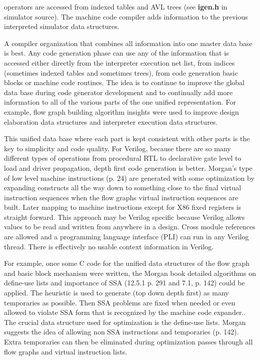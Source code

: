 \documentclass[preprint, authoryear]{sigplanconf}
\begin{document}
operators are accessed from indexed tables and AVL trees (see \textbf{igen.h}
in simulator source).  The machine code compiler adds information to the
previous interpreted simulator data structures.
\par
A compiler organization that combines all information into one
master data base is best.  Any code generation phase can use any
of the information that is accessed either directly from the interpreter
execution net list, from indices (sometimes indexed tables and sometimes
trees), from code generation basic blocks or machine code routines.
The idea is to continue to improve the global data base during code generator
development and to continually add more information to all of the various
parts of the one unified representation.  For example, flow graph
building algorithm insights were used to improve design elaboration
data structures and interpreter execution data structures.
\par
This unified data base where each part is kept consistent with other
parts is the key to simplicity and code quality.  For Verilog,
because there are so many different types of operations from
procedural RTL to declarative gate level to load and driver propagation,
depth first code generation is better.  Morgan's type of low level
machine instructions (p. 24) are generated with some optimization by
expanding constructs all the way down to something close to the final
virtual instruction sequences when the flow graphs virtual instruction
sequences are built.  Later mapping to machine instructions except
for X86 fixed registers is straight forward.  This approach may be
Verilog specific because Verilog allows values to be read and written
from anywhere in a design.  Cross module references are allowed and
a programming language interface (PLI) can run in any Verilog thread. 
There is effectively no usable context information in Verilog.
\par
For example, once some C code for the unified data structures of the flow
graph and basic block mechanism were written, the Morgan book detailed
algorithms on define-use lists and importance of SSA
(12.5.1 p. 291 and 7.1, p. 142) could be applied.
The heuristic is used to generate (top down depth first) as many
temporaries as possible.  Then SSA problems are fixed when needed or even
allowed to violate SSA form that is recognized by the machine code
expander..
The crucial data structure used for optimization is the
define-use lists.  Morgan suggests the idea
of allowing non SSA instructions and temporaries (p. 142).  Extra
temporaries can then be eliminated during optimization passes through
all flow graphs and virtual instruction lists.
\end{document}
